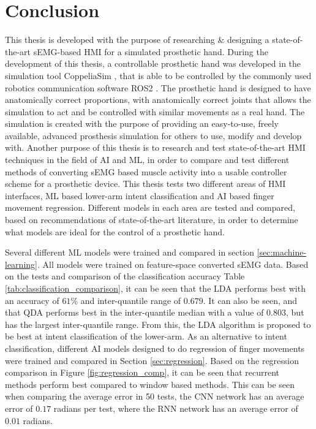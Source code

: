 \documentclass[../main.tex]{subfiles}
\begin{document}
\section{Conclusion}

This thesis is developed with the purpose of researching \& designing a state-of-the-art \gls{sEMG}-based \gls{HMI} for a simulated prosthetic hand.
During the development of this thesis, a controllable prosthetic hand was developed in the simulation tool CoppeliaSim \cite{coppeliasim}, that is able to be controlled by the commonly used robotics communication software ROS2 \cite{ros2}.
The prosthetic hand is designed to have anatomically correct proportions, with anatomically correct joints that allows the simulation to act and be controlled with similar movements as a real hand. 
The simulation is created with the purpose of providing an easy-to-use, freely available, advanced prosthesis simulation for others to use, modify and develop with. 
Another purpose of this thesis is to research and test state-of-the-art \gls{HMI} techniques in the field of \gls{AI} and \gls{ML}, in order to compare and test different methods of converting \gls{sEMG} based muscle activity into a usable controller scheme for a prosthetic device.
This thesis tests two different areas of \gls{HMI} interfaces, \gls{ML} based lower-arm intent classification and \gls{AI} based finger movement regression.
Different models in each area are tested and compared, based on recommendations of state-of-the-art
literature, in order to determine what models are ideal for the control of a prosthetic hand.

Several different \gls{ML} models were trained and compared in section \ref{sec:machine-learning}.
All models were trained on feature-space converted \gls{sEMG} data.
Based on the tests and comparison of the classification accuracy Table \ref{tab:classification_comparison}, it can be seen that the \gls{LDA} performs best with an accuracy of $61\%$ and inter-quantile range of $0.679$.
It can also be seen, and that \gls{QDA} performs best in the inter-quantile median with a value of $0.803$, but has the largest inter-quantile range.
From this, the \gls{LDA} algorithm is proposed to be best at intent classification of the lower-arm.
As an alternative to intent classification, different \gls{AI} models designed to do regression of finger movements were trained and compared in Section \ref{sec:regression}.
Based on the regression comparison in Figure \ref{fig:regression_comp}, it can be seen that recurrent methods perform best compared to window based methods.
This can be seen when comparing the average error in 50 tests, the \gls{CNN} network has an average error of $0.17$ radians per test, where the \gls{RNN} network has an average error of $0.01$ radians.
\end{document}
